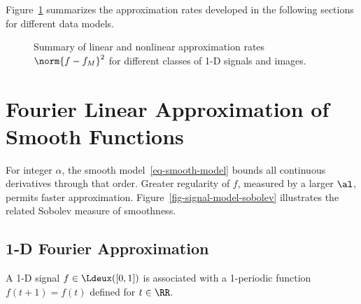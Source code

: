                                               
                                
                                   
  
                                                                                                     
 
                                        
     
                                                                                                                         
  
                 
                                        
                                 
                               
                               
  

           
   



Figure~\ref{fig-approx-comparaison} summarizes the approximation rates developed in the following sections for different data models.

\begin{figure}[tbp]
\centering
{}
\caption{Summary of linear and nonlinear approximation rates
	$\norm{f-f_M}^2$ for different classes of 1-D signals and images.}
\label{fig-approx-comparaison}
\end{figure}


                                        
                                        
\section{Fourier Linear Approximation of Smooth Functions}

For integer $\alpha$, the smooth model~\eqref{eq-smooth-model} bounds all continuous derivatives through that order. Greater regularity of $f$, measured by a larger $\al$, permits faster approximation. Figure~\ref{fig-signal-model-sobolev} illustrates the related Sobolev measure of smoothness.

                                        
\subsection{1-D Fourier Approximation}

A 1-D signal $f \in \Ldeux([0,1])$ is associated with a 1-periodic function $f(t+1)=f(t)$ defined for $t \in \RR$.

